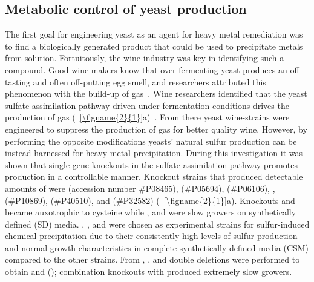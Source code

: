 \documentclass[../main/main]{subfiles}
\begin{document}
\subsection{Metabolic control of yeast \HS{} production}
The first goal for engineering yeast as an agent for heavy metal remediation was to find a biologically generated product that could be used to precipitate metals from solution. Fortuitously, the wine-industry was key in identifying such a compound. Good wine makers know that over-fermenting yeast produces an off-tasting and often off-putting egg smell, and researchers attributed this phenomenon with the build-up of \HS{} gas~\cite{swiegers2007}. Wine researchers identified that the yeast sulfate assimilation pathway driven under fermentation conditions drives the production of \HS{} gas (\FIGURE~\ref{\figname{2}{1}}a)~\cite{swiegers2007,linderholm2008}. From there yeast wine-strains were engineered to suppress the production of \HS{} gas for better quality wine. However, by performing the opposite modifications yeasts' natural sulfur production can be instead harnessed for heavy metal precipitation. During this investigation it was shown that single gene knockouts in the sulfate assimilation pathway promotes \HS{} production in a controllable manner. Knockout strains that produced detectable amounts of \HS{} were
 (accession number \#P08465),
 (\#P05694),
 (\#P06106),
,
 (\#P10869),
 (\#P40510),
and  (\#P32582)
(\FIGURE~\ref{\figname{2}{1}}a).
Knockouts  and  became auxotrophic to cysteine while , and  were slow growers on synthetically defined (SD) media. , , and  were chosen as experimental strains for sulfur-induced chemical precipitation due to their consistently high levels of sulfur production and normal growth characteristics in complete synthetically defined media (CSM) compared to the other strains. From , , and  double deletions were performed to obtain  and  ();
combination knockouts with  produced extremely slow growers.
\end{document}
